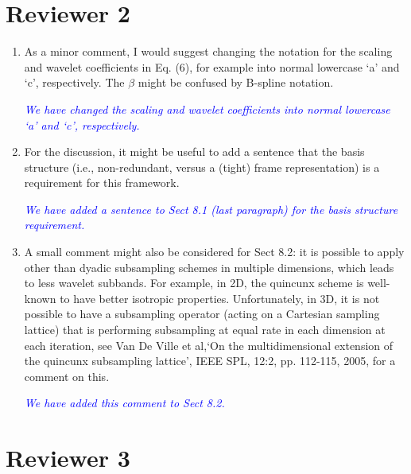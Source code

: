 \documentclass{article}
\newcommand{\parham}[1]{\textcolor{blue}{#1}}
\begin{document}
    \section{Reviewer 2}
    
\begin{enumerate}
    \item As a minor comment, I would suggest changing the notation for the scaling and wavelet coefficients in Eq. (6), for example into normal lowercase `a' and `c', respectively. The $\beta$ might be confused by B-spline notation. 

	\emph{\parham{We have changed the scaling and wavelet coefficients into normal lowercase `a' and `c', respectively.}}

\item For the discussion, it might be useful to add a sentence that the basis structure (i.e., non-redundant, versus a (tight) frame representation) is a requirement for this framework.

\emph{\parham{We have added a sentence to Sect 8.1 (last paragraph) for the basis structure requirement.}}



\item A small comment might also be considered for Sect 8.2: it is possible to apply other than dyadic subsampling schemes in multiple dimensions, which leads to less wavelet subbands. For example, in 2D, the quincunx scheme is well-known to have better isotropic properties. Unfortunately, in 3D, it is not possible to have a subsampling operator (acting on a Cartesian sampling lattice) that is performing subsampling at equal rate in each dimension at each iteration, see Van De Ville et al,`On the multidimensional extension of the quincunx subsampling lattice', IEEE SPL, 12:2, pp.  112-115, 2005, for a comment on this. 

\emph{\parham{We have added this comment to Sect 8.2.}}



 

\end{enumerate}  

    \section{Reviewer 3}  
\end{document}

